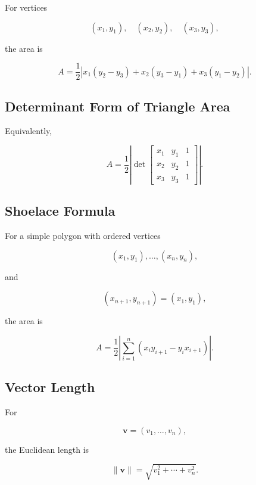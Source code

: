 For vertices

\[
(x_1,y_1),
\quad
(x_2,y_2),
\quad
(x_3,y_3),
\]

the area is

\[
\boxed{
A
=
\frac12
\left|
x_1(y_2-y_3)
+
x_2(y_3-y_1)
+
x_3(y_1-y_2)
\right|.
}
\]

\subsection{Determinant Form of Triangle Area}
\label{subsec:triangle-area-determinant}

Equivalently,

\[
\boxed{
A
=
\frac12
\left|
\det
\begin{bmatrix}
x_1 & y_1 & 1\\
x_2 & y_2 & 1\\
x_3 & y_3 & 1
\end{bmatrix}
\right|.
}
\]

\subsection{Shoelace Formula}
\label{subsec:shoelace-formula-reference}

For a simple polygon with ordered vertices

\[
(x_1,y_1),
\ldots,
(x_n,y_n),
\]

and

\[
(x_{n+1},y_{n+1})
=
(x_1,y_1),
\]

the area is

\[
\boxed{
A
=
\frac12
\left|
\sum_{i=1}^{n}
(x_iy_{i+1}-y_ix_{i+1})
\right|.
}
\]

\subsection{Vector Length}
\label{subsec:vector-length-geometric-reference}

For

\[
\mathbf{v}
=
(v_1,\ldots,v_n),
\]

the Euclidean length is

\[
\boxed{
\|\mathbf{v}\|
=
\sqrt{
v_1^2+\cdots+v_n^2
}.
}
\]

